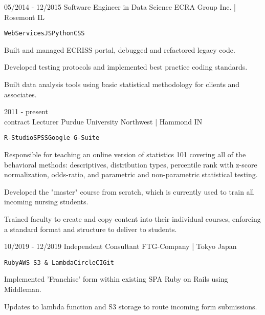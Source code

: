 \documentclass[9pt]{developercv} %
\begin{document}
\begin{entrylist}
{}
	\entry
		{05/2014 - 12/2015}
		{Software Engineer in Data Science}
		{ECRA Group Inc. | Rosemont IL}
		{
		\texttt{WebServices}\slashsep\texttt{JS}\slashsep\texttt{Python}\slashsep\texttt{CSS}
		 \begin{compactitem}
		 \item Built and managed ECRISS portal, debugged and refactored legacy code. 
		 \item Developed testing protocols and implemented best practice coding standards. 
		 \item Built data analysis tools using basic statistical methodology for clients and associates.
		 \end{compactitem}
		 }
	\entry
		{2011 - present \\\footnotesize{contract}}
		{Lecturer}
		{Purdue University Northwest | Hammond IN}
		{
		\texttt{R-Studio}\slashsep\texttt{SPSS}\slashsep\texttt{Google G-Suite}
		 \begin{compactitem}
		\item Responsible for teaching an online version of statistics 101 covering all of the behavioral methods: descriptives, distribution types, percentile rank with z-score normalization, odds-ratio, and parametric and non-parametric statistical testing. 
		\item Developed the "master" course from scratch, which is currently used to train all incoming nursing students. 
		\item Trained faculty to create and copy content into their individual courses, enforcing a standard format  and structure to deliver to students. 
		 \end{compactitem}}

	\entry
		{10/2019 - 12/2019}
		{Independent Consultant}
		{FTG-Company | Tokyo Japan}
		 {
		 \texttt{Ruby}\slashsep\texttt{AWS S3 \& Lambda}\slashsep\texttt{CircleCI}\slashsep\texttt{Git}
		 \begin{compactitem}
		 \item Implemented 'Franchise' form within existing SPA Ruby on Rails using Middleman. 
		 \item Updates to lambda function and S3 storage to route incoming form submissions.  	
		 		 \end{compactitem}
}	
	

\end{entrylist}
\end{document}
